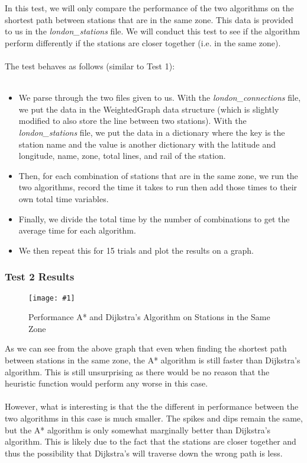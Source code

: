 \documentclass{article}
\newcommand{\figureInsetScaled}[3]
{
    \FloatBarrier{}
    \begin{figure}[ht!]
        \centering
        \texttt{[image: \#1]}
        \caption{#2}
    \end{figure}
    \FloatBarrier{}
}
\begin{document}
In this test, we will only compare the performance of the two algorithms on the shortest path between stations that are in the same zone. This data is provided to us in the \emph{london\_stations} file. We will conduct this test to see if the algorithm perform differently if the stations are closer together (i.e. in the same zone).\\
\\
The test behaves as follows (similar to Test 1): \\
\\
\begin{itemize}
    \item We parse through the two files given to us. With the \emph{london\_connections} file, we put the data in the WeightedGraph data structure (which is slightly modified to also store the line between two stations). With the \emph{london\_stations} file, we put the data in a dictionary where the key is the station name and the value is another dictionary with the latitude and longitude, name, zone, total lines, and rail of the station. \\
    \item Then, for each combination of stations that are in the same zone, we run the two algorithms, record the time it takes to run then add those times to their own total time variables.
    \item Finally, we divide the total time by the number of combinations to get the average time for each algorithm.
    \item We then repeat this for 15 trials and plot the results on a graph.
    
\end{itemize}

\subsubsection{Test 2 Results}

\figureInsetScaled{images/part3/SameZone.png}{Performance A* and Dijkstra’s Algorithm on Stations in the Same Zone}{1}

As we can see from the above graph that even when finding the shortest path between stations in the same zone, the A* algorithm is still faster than Dijkstra’s algorithm. This is still unsurprising as there would be no reason that the heuristic function would perform any worse in this case.\\
\\
However, what is interesting is that the the different in performance between the two algorithms in this case is much smaller. The spikes and dips remain the same, but the A* algorithm is only somewhat marginally better than Dijkstra’s algorithm. This is likely due to the fact that the stations are closer together and thus the possibility that Dijkstra’s will traverse down the wrong path is less. \\
\end{document}
